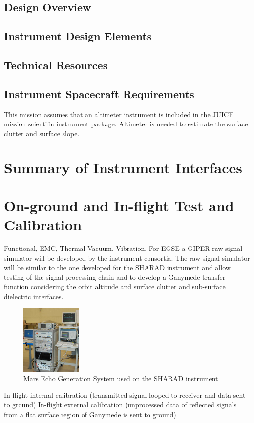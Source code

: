 \subsection{Design Overview}
\subsection{Instrument Design Elements}
\subsection{Technical Resources}
\subsection{Instrument Spacecraft Requirements}
This mission assumes that an altimeter instrument is included in the JUICE mission scientific instrument package. Altimeter is needed to estimate the surface clutter and surface slope.
%
\section{Summary of Instrument Interfaces}
%
\section{On-ground and In-flight Test and Calibration}
%
Functional, EMC, Thermal-Vacuum, Vibration.
%
%
For \ac{EGSE} a \ac{GIPER} raw signal simulator will be developed by the instrument consortia. The raw signal simulator will be similar to the one developed for the \ac{SHARAD} instrument\cite{Giovanni} and allow testing of the signal processing chain and to develop a Ganymede transfer function considering the orbit altitude and surface clutter and sub-surface dielectric interfaces. 
%
%
\begin{figure}
\centering
\includegraphics[width=0.27\textwidth]{figures/MEGS}
\caption[caption]{Mars Echo Generation System used on the SHARAD instrument\cite{MEGS}}
\label{fig:MEGS}
\end{figure}
%
%
In-flight internal calibration (transmitted signal looped to receiver and data sent to ground)
In-flight external calibration (unprocessed data of reflected signals from a flat surface region of Ganymede is sent to ground)
%
%
